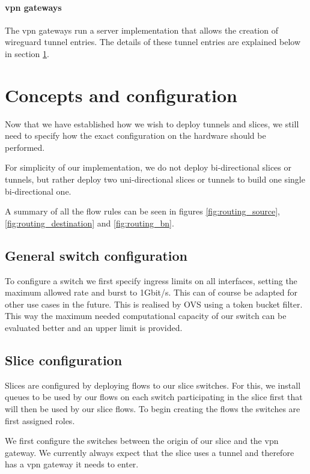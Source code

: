 \paragraph{\acrshort{vpn} gateways} The \acrshort{vpn} gateways run a server implementation that allows the creation of \gls{wireguard} \cite{wireguard} tunnel entries. The details of these tunnel entries are explained below in section \ref{impl_concepts}.


\section{Concepts and configuration}
\label{impl_concepts}
Now that we have established how we wish to deploy tunnels and slices, we still need to specify how the exact configuration on the hardware should be performed.

For simplicity of our implementation, we do not deploy bi-directional slices or tunnels, but rather deploy two uni-directional slices or tunnels to build one single bi-directional one.

A summary of all the flow rules can be seen in figures \ref{fig:routing_source}, \ref{fig:routing_destination} and \ref{fig:routing_bn}.

\subsection{General switch configuration}
To configure a switch we first specify ingress limits on all interfaces, setting the maximum allowed rate and burst to 1Gbit/s. This can of course be adapted for other use cases in the future. This is realised by OVS using a token bucket filter. This way the maximum needed computational capacity of our switch can be evaluated better and an upper limit is provided.

\subsection{Slice configuration}
Slices are configured by deploying flows to our slice switches. For this, we install queues to be used by our flows on each switch participating in the slice first that will then be used by our slice flows. To begin creating the flows the switches are first assigned roles.

We first configure the switches between the origin of our slice and the \acrshort{vpn} gateway. We currently always expect that the slice uses a tunnel and therefore has a \acrshort{vpn} gateway it needs to enter.

